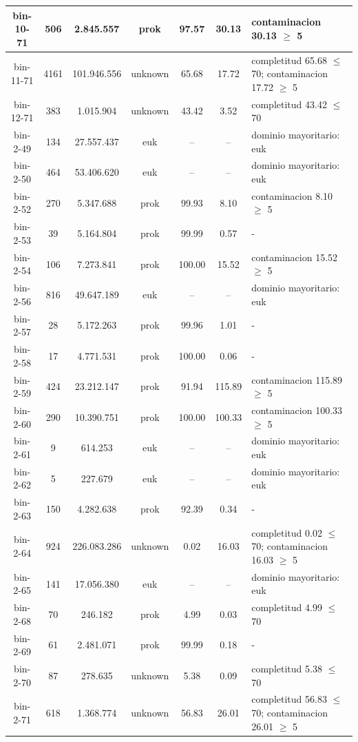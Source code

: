 \begin{xltabular}{\textwidth}{|c|c|c|c|c|c|>{\centering\arraybackslash}X|}
bin-10-71 & 506 & 2.845.557 & prok & 97.57 & 30.13 & contaminacion 30.13 $\ge$ 5 \\ \hline
bin-11-71 & 4161 & 101.946.556 & unknown & 65.68 & 17.72 & completitud 65.68 $\le$ 70; contaminacion 17.72 $\ge$ 5 \\ \hline
bin-12-71 & 383 & 1.015.904 & unknown & 43.42 & 3.52 & completitud 43.42 $\le$ 70 \\ \hline
bin-2-49 & 134 & 27.557.437 & euk & -- & -- & dominio mayoritario: euk \\ \hline
bin-2-50 & 464 & 53.406.620 & euk & -- & -- & dominio mayoritario: euk \\ \hline
bin-2-52 & 270 & 5.347.688 & prok & 99.93 & 8.10 & contaminacion 8.10 $\ge$ 5 \\ \hline
bin-2-53 & 39 & 5.164.804 & prok & 99.99 & 0.57 & - \\ \hline
bin-2-54 & 106 & 7.273.841 & prok & 100.00 & 15.52 & contaminacion 15.52 $\ge$ 5 \\ \hline
bin-2-56 & 816 & 49.647.189 & euk & -- & -- & dominio mayoritario: euk \\ \hline
bin-2-57 & 28 & 5.172.263 & prok & 99.96 & 1.01 & - \\ \hline
bin-2-58 & 17 & 4.771.531 & prok & 100.00 & 0.06 & - \\ \hline
bin-2-59 & 424 & 23.212.147 & prok & 91.94 & 115.89 & contaminacion 115.89 $\ge$ 5 \\ \hline
bin-2-60 & 290 & 10.390.751 & prok & 100.00 & 100.33 & contaminacion 100.33 $\ge$ 5 \\ \hline
bin-2-61 & 9 & 614.253 & euk & -- & -- & dominio mayoritario: euk \\ \hline
bin-2-62 & 5 & 227.679 & euk & -- & -- & dominio mayoritario: euk \\ \hline
bin-2-63 & 150 & 4.282.638 & prok & 92.39 & 0.34 & - \\ \hline
bin-2-64 & 924 & 226.083.286 & unknown & 0.02 & 16.03 & completitud 0.02 $\le$ 70; contaminacion 16.03 $\ge$ 5 \\ \hline
bin-2-65 & 141 & 17.056.380 & euk & -- & -- & dominio mayoritario: euk \\ \hline
bin-2-68 & 70 & 246.182 & prok & 4.99 & 0.03 & completitud 4.99 $\le$ 70 \\ \hline
bin-2-69 & 61 & 2.481.071 & prok & 99.99 & 0.18 & - \\ \hline
bin-2-70 & 87 & 278.635 & unknown & 5.38 & 0.09 & completitud 5.38 $\le$ 70 \\ \hline
bin-2-71 & 618 & 1.368.774 & unknown & 56.83 & 26.01 & completitud 56.83 $\le$ 70; contaminacion 26.01 $\ge$ 5 \\ \hline

\end{xltabular}

